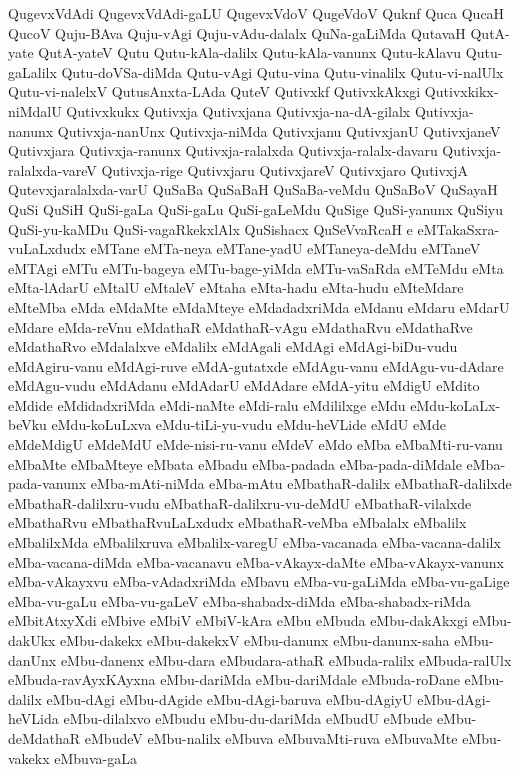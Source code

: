 {QugevxVdAdi
QugevxVdAdi-gaLU
QugevxVdoV
QugeVdoV
Quknf
Quca
QucaH
QucoV
Quju-BAva
Quju-vAgi
Quju-vAdu-dalalx
QuNa-gaLiMda
QutavaH
QutA-yate
QutA-yateV
Qutu
Qutu-kAla-dalilx
Qutu-kAla-vanunx
Qutu-kAlavu
Qutu-gaLalilx
Qutu-doVSa-diMda
Qutu-vAgi
Qutu-vina
Qutu-vinalilx
Qutu-vi-nalUlx
Qutu-vi-nalelxV
QutusAnxta-LAda
QuteV
Qutivxkf
QutivxkAkxgi
Qutivxkikx-niMdalU
Qutivxkukx
Qutivxja
Qutivxjana
Qutivxja-na-dA-gilalx
Qutivxja-nanunx
Qutivxja-nanUnx
Qutivxja-niMda
Qutivxjanu
QutivxjanU
QutivxjaneV
Qutivxjara
Qutivxja-ranunx
Qutivxja-ralalxda
Qutivxja-ralalx-davaru
Qutivxja-ralalxda-vareV
Qutivxja-rige
Qutivxjaru
QutivxjareV
Qutivxjaro
QutivxjA
Qutevxjaralalxda-varU
QuSaBa
QuSaBaH
QuSaBa-veMdu
QuSaBoV
QuSayaH
QuSi
QuSiH
QuSi-gaLa
QuSi-gaLu
QuSi-gaLeMdu
QuSige
QuSi-yanunx
QuSiyu
QuSi-yu-kaMDu
QuSi-vagaRkekxlAlx
QuSishacx
QuSeVvaRcaH
e
eMTakaSxra-vuLaLxdudx
eMTane
eMTa-neya
eMTane-yadU
eMTaneya-deMdu
eMTaneV
eMTAgi
eMTu
eMTu-bageya
eMTu-bage-yiMda
eMTu-vaSaRda
eMTeMdu
eMta
eMta-lAdarU
eMtalU
eMtaleV
eMtaha
eMta-hadu
eMta-hudu
eMteMdare
eMteMba
eMda
eMdaMte
eMdaMteye
eMdadadxriMda
eMdanu
eMdaru
eMdarU
eMdare
eMda-reVnu
eMdathaR
eMdathaR-vAgu
eMdathaRvu
eMdathaRve
eMdathaRvo
eMdalalxve
eMdalilx
eMdAgali
eMdAgi
eMdAgi-biDu-vudu
eMdAgiru-vanu
eMdAgi-ruve
eMdA-gutatxde
eMdAgu-vanu
eMdAgu-vu-dAdare
eMdAgu-vudu
eMdAdanu
eMdAdarU
eMdAdare
eMdA-yitu
eMdigU
eMdito
eMdide
eMdidadxriMda
eMdi-naMte
eMdi-ralu
eMdililxge
eMdu
eMdu-koLaLx-beVku
eMdu-koLuLxva
eMdu-tiLi-yu-vudu
eMdu-heVLide
eMdU
eMde
eMdeMdigU
eMdeMdU
eMde-nisi-ru-vanu
eMdeV
eMdo
eMba
eMbaMti-ru-vanu
eMbaMte
eMbaMteye
eMbata
eMbadu
eMba-padada
eMba-pada-diMdale
eMba-pada-vanunx
eMba-mAti-niMda
eMba-mAtu
eMbathaR-dalilx
eMbathaR-dalilxde
eMbathaR-dalilxru-vudu
eMbathaR-dalilxru-vu-deMdU
eMbathaR-vilalxde
eMbathaRvu
eMbathaRvuLaLxdudx
eMbathaR-veMba
eMbalalx
eMbalilx
eMbalilxMda
eMbalilxruva
eMbalilx-varegU
eMba-vacanada
eMba-vacana-dalilx
eMba-vacana-diMda
eMba-vacanavu
eMba-vAkayx-daMte
eMba-vAkayx-vanunx
eMba-vAkayxvu
eMba-vAdadxriMda
eMbavu
eMba-vu-gaLiMda
eMba-vu-gaLige
eMba-vu-gaLu
eMba-vu-gaLeV
eMba-shabadx-diMda
eMba-shabadx-riMda
eMbitAtxyXdi
eMbive
eMbiV
eMbiV-kAra
eMbu
eMbuda
eMbu-dakAkxgi
eMbu-dakUkx
eMbu-dakekx
eMbu-dakekxV
eMbu-danunx
eMbu-danunx-saha
eMbu-danUnx
eMbu-danenx
eMbu-dara
eMbudara-athaR
eMbuda-ralilx
eMbuda-ralUlx
eMbuda-ravAyxKAyxna
eMbu-dariMda
eMbu-dariMdale
eMbuda-roDane
eMbu-dalilx
eMbu-dAgi
eMbu-dAgide
eMbu-dAgi-baruva
eMbu-dAgiyU
eMbu-dAgi-heVLida
eMbu-dilalxvo
eMbudu
eMbu-du-dariMda
eMbudU
eMbude
eMbu-deMdathaR
eMbudeV
eMbu-nalilx
eMbuva
eMbuvaMti-ruva
eMbuvaMte
eMbu-vakekx
eMbuva-gaLa
}
